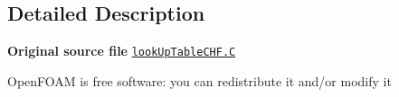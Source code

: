 \subsection{Detailed Description}
{\bfseries Original source file} \href{../../../home/carlo/data/GeN-Foam/GeN-Foam_ffn/GeN-Foam/GeN-Foam/classes/thermalHydraulics/src/physicsModels/heatTransferModels/FSHeatTransferCoefficientModels/subModels/CHFModels/criticalHeatFluxModels/lookUpTableCHF/lookUpTableCHF.C}{\tt look\+Up\+Table\+C\+H\+F.\+C}

Open\+F\+O\+AM is free software\+: you can redistribute it and/or modify it 